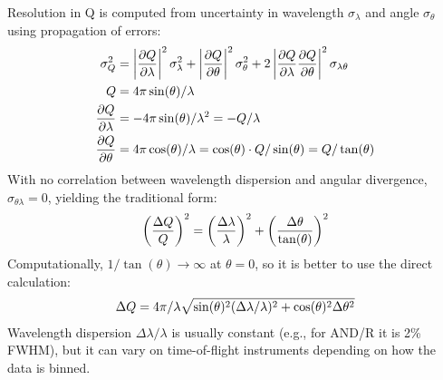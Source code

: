 \documentclass[letterpaper,10pt,english]{sphinxmanual}
\begin{document}
Resolution in Q is computed from uncertainty in wavelength $\sigma_\lambda$
and angle $\sigma_\theta$ using propagation of errors:
\begin{gather}
\begin{split}\sigma^2_Q
    &= \left|\frac{\partial Q}{\partial \lambda}\right|^2 \sigma_\lambda^2
     + \left|\frac{\partial Q}{\partial \theta}\right|^2 \sigma_\theta^2
     + 2 \left|\frac{\partial Q}{\partial \lambda}
               \frac{\partial Q}{\partial \theta}\right|^2
               \sigma_{\lambda\theta}
     \\
Q &= 4 \pi \sin(\theta) / \lambda \\
\frac{\partial Q}{\partial \lambda} &= -4 \pi \sin(\theta)/\lambda^2
     = -Q/\lambda \\
\frac{\partial Q}{\partial \theta} &= 4 \pi \cos(\theta)/\lambda
     = \cos(\theta) \cdot Q/\sin(\theta) = Q/\tan(\theta)\end{split}\notag
\end{gather}
With no correlation between wavelength dispersion and angular divergence,
$\sigma_{\theta\lambda} = 0$, yielding the traditional form:
\begin{gather}
\begin{split}\left(\frac{\Delta Q}{Q}\right)^2
     = \left(\frac{\Delta \lambda}{\lambda}\right)^2
     + \left(\frac{\Delta \theta}{\tan(\theta)}\right)^2\end{split}\notag
\end{gather}
Computationally, $1/\tan(\theta) \rightarrow \infty$ at $\theta=0$, so
it is better to use the direct calculation:
\begin{gather}
\begin{split}\Delta Q = 4 \pi/\lambda \sqrt{\sin(\theta)^2 (\Delta\lambda/\lambda)^2
                               + \cos(\theta)^2 \Delta \theta^2}\end{split}\notag
\end{gather}
Wavelength dispersion $\Delta \lambda/\lambda$ is usually constant
(e.g., for AND/R it is 2\% FWHM), but it can vary on time-of-flight
instruments depending on how the data is binned.
\end{document}
